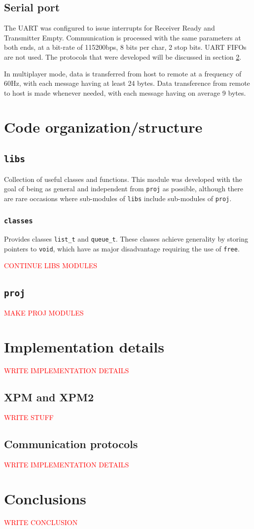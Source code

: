 \documentclass{article}
\theoremstyle{remark}
\begin{document}
\subsection{Serial port}
The UART was configured to issue interrupts for Receiver Ready and Transmitter Empty. Communication is processed with the same parameters at both ends, at a bit-rate of 115200bps, 8 bits per char, 2 stop bits. UART FIFOs are not used. The protocols that were developed will be discussed in section \ref{sec:details}. \par
In multiplayer mode, data is transferred from host to remote at a frequency of 60Hz, with each message having at least 24 bytes. Data transference from remote to host is made whenever needed, with each message having on average 9 bytes.
\pagebreak
\section{Code organization/structure}
\subsection{\texttt{libs}}
Collection of useful classes and functions. This module was developed with the goal of being as general and independent from \texttt{proj} as possible, although there are rare occasions where sub-modules of \texttt{libs} include sub-modules of \texttt{proj}.
\subsubsection{\texttt{classes}}
Provides classes \texttt{list\_t} and \texttt{queue\_t}. These classes achieve generality by storing pointers to \texttt{void}, which have as major disadvantage requiring the use of \texttt{free}. \par
\textcolor{red}{CONTINUE LIBS MODULES}
\subsection{\texttt{proj}}
\textcolor{red}{MAKE PROJ MODULES}
\section{Implementation details} \label{sec:details}
\textcolor{red}{WRITE IMPLEMENTATION DETAILS}
\subsection{XPM and XPM2}
\textcolor{red}{WRITE STUFF}
\subsection{Communication protocols}
\textcolor{red}{WRITE IMPLEMENTATION DETAILS}
\section{Conclusions}
\textcolor{red}{WRITE CONCLUSION}
\end{document}
